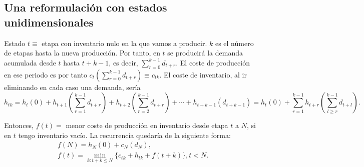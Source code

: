\documentclass[MIOP.tex]{subfiles}
\begin{document}
\subsection{Una reformulación con estados unidimensionales}
Estado $t\equiv$ etapa con inventario nulo en la que vamos a producir. $k$ es el número de etapas hasta la nueva producción. Por tanto, en $t$ se producirá la demanda acumulada desde $t$ hasta $t+k-1$, es decir, $\sum_{r=0}^{k-1}d_{t+r}$. El coste de producción en ese periodo es por tanto $c_t(\sum_{r=0}^{k-1}d_{t+r})\equiv c_{tk}$. El coste de inventario, al ir eliminando en cada caso una demanda,  sería 
$$h_{tk}=h_t(0)+h_{t+1}\left(\sum_{r=1}^{k-1}d_{t+r}\right)+h_{t+2}\left(\sum_{r=2}^{k-1}d_{t+r}\right)+\cdots +h_{t+k-1}(d_{t+k-1})=h_t(0)+\sum_{r=1}^{k-1}h_{t+r}\left(\sum_{l\geq r}^{k-1}d_{t+l}\right).$$

Entonces,  $f(t)=$ menor coste de producción en inventario desde etapa $t$ a $N$, si en $t$ tengo inventario vacío. La recurrencia quedaría de la siguiente forma:
\begin{align*}
&f(N)=h_N(0)+c_N(d_N),\\
&f(t)=\min_{k:t+k\leq N}\{c_{tk}+h_{tk}+f(t+k)\}, t<N.
\end{align*}
\end{document}
